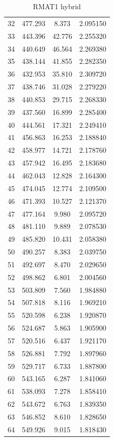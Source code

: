 \documentclass[10pt,twocolumn,letterpaper]{article}
\begin{document}
\begin{table}[h]
\begin{tabular}{@{}c|ccc@{}}
32 & 477.293 & 8.373 & 2.095150 \\
33 & 443.396 & 42.776 & 2.255320 \\
34 & 440.649 & 46.564 & 2.269380 \\
35 & 438.144 & 41.855 & 2.282350 \\
36 & 432.953 & 35.810 & 2.309720 \\
37 & 438.746 & 31.028 & 2.279220 \\
38 & 440.853 & 29.715 & 2.268330 \\
39 & 437.560 & 16.899 & 2.285400 \\
40 & 444.561 & 17.321 & 2.249410 \\
41 & 456.863 & 16.253 & 2.188840 \\
42 & 458.977 & 14.721 & 2.178760 \\
43 & 457.942 & 16.495 & 2.183680 \\
44 & 462.043 & 12.828 & 2.164300 \\
45 & 474.045 & 12.774 & 2.109500 \\
46 & 471.393 & 10.527 & 2.121370 \\
47 & 477.164 & 9.980 & 2.095720 \\
48 & 481.110 & 9.889 & 2.078530 \\
49 & 485.820 & 10.431 & 2.058380 \\
50 & 490.257 & 8.383 & 2.039750 \\
51 & 492.697 & 8.470 & 2.029650 \\
52 & 498.862 & 6.801 & 2.004560 \\
53 & 503.809 & 7.560 & 1.984880 \\
54 & 507.818 & 8.116 & 1.969210 \\
55 & 520.598 & 6.238 & 1.920870 \\
56 & 524.687 & 5.863 & 1.905900 \\
57 & 520.516 & 6.437 & 1.921170 \\
58 & 526.881 & 7.792 & 1.897960 \\
59 & 529.717 & 6.733 & 1.887800 \\
60 & 543.165 & 6.287 & 1.841060 \\
61 & 538.093 & 7.278 & 1.858410 \\
62 & 543.672 & 6.763 & 1.839350 \\
63 & 546.852 & 8.610 & 1.828650 \\
64 & 549.926 & 9.015 & 1.818430 \\
\bottomrule
\end{tabular}
\caption{RMAT1 hybrid}
\end{table}
\end{document}
